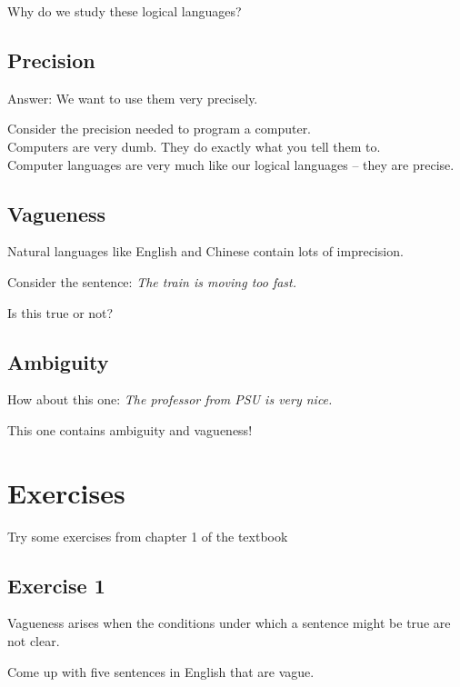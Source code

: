 \documentclass[
paper=128mm:96mm, %
fontsize=11pt, %
pagesize, %
parskip=half-, %
]{scrartcl} %
\theoremstyle{mythmstyle} %
\begin{document}
Why do we study these logical languages?

\clearpage

\subsection{Precision}

Answer: We want to use them very precisely.

Consider the precision needed to program a computer. \\
Computers are very dumb. They do exactly what you tell them to.\\
Computer languages are very much like our logical languages -- they are precise.

\clearpage

\subsection{Vagueness}
Natural languages like English and Chinese contain lots of imprecision.

Consider the sentence: \textit{The train is moving too fast.}

Is this true or not? 

\clearpage

\subsection{Ambiguity}

How about this one: \textit{The professor from PSU is very nice.}

This one contains ambiguity and vagueness!

\clearpage
\section{Exercises}

Try some exercises from chapter 1 of the textbook

\clearpage

\subsection{Exercise 1}

Vagueness arises when the conditions under which a sentence might be true are not clear. 

Come up with five sentences in English that are vague.
\end{document}
